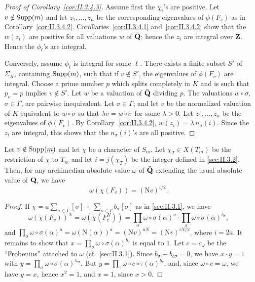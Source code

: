 \begin{proof}[Proof of Corollary~\ref{cor:II.3.4.3}]
Assume first the $\chi_i$'s are positive.  Let $v \notin \mathrm{Supp}(m)$ and
let $z_1, \ldots, z_n$ be the corresponding eigenvalues of $\phi(F_v)$
as in Corollary~\ref{cor:II.3.4.2}.  Corollaries~\ref{cor:II.3.4.1} and~\ref{cor:II.3.4.2} show that the $w(z_i)$ are
positive for all valuations $w$ of $\bar{\mathbf{Q}}$; hence the $z_i$ are
integral over $\mathbf{Z}$.  Hence the $\phi_\ell$'s are integral.

Conversely, assume $\phi_\ell$ is integral for some $\ell$.  There exists
a finite subset $S'$ of $\Sigma_K$, containing $\mathrm{Supp}(m)$, such that if
$v \notin S'$, the eigenvalues of $\phi(F_v)$ are integral.  Choose a
prime number $p$ which splits completely in $K$ and is such that
$p_v = p$ implies $v \notin S'$.  Let $w$ be a valuation of $\bar{\mathbf{Q}}$
dividing $p$.  The valuations $w \circ \sigma$, $\sigma \in \Gamma$, are
pairwise inequivalent.  Let $\sigma \in \Gamma$; and let $v$ be the
normalized valuation of $K$ equivalent to $w \circ \sigma$ so that
$\lambda v = w \circ \sigma$ for some $\lambda > 0$.  Let
$z_1, \ldots, z_n$ be the eigenvalues of $\phi(F_v)$.  By Corollary~\ref{cor:II.3.4.2},
$w(z_i) = \lambda\, n_\sigma(i)$.  Since the $z_i$ are integral, this
shows that the $n_\sigma(i)$'s are all positive.
\end{proof}

\begin{proposition}[2]\label{prop:II.3.4.2}
Let $v \notin \mathrm{Supp}(m)$ and let $\chi$ be a character of $S_m$.  Let
$\chi_T \in X(T_m)$ be the restriction of $\chi$ to $T_m$ and let
$i = j(\chi_T)$ be the integer defined in \ref{sec:II.3.2}.  Then, for any
archimedian absolute value $\omega$ of $\bar{\mathbf{Q}}$ extending the usual
absolute value of $\mathbf{Q}$, we have
\[
\omega(\chi(F_v)) = (\mathrm{N}v)^{i/2}.
\]
\end{proposition}

\begin{proof}
If $\chi = a \sum\limits_{\sigma \in \Gamma} [\sigma] +
\sum\limits_{\sigma \in \Gamma} b_\sigma[\sigma]$ as in \ref{sec:II.3.1}, we have
\[
\omega(\chi(F_v))^N = \omega(\chi(F_v^N)) = \prod_\sigma
\omega \circ \sigma(\alpha)^a \cdot \prod_\sigma
\omega \circ \sigma(\alpha)^{b_\sigma},
\]
and
$\prod\limits_\sigma \omega \circ \sigma(\alpha)^a
= \omega(\mathrm{N}(\alpha))^a = (\mathrm{N}v)^{aN}
= (\mathrm{N}v)^{iN/2}$, where $i = 2a$.  It remains to show that
$x = \prod\limits_\sigma \omega \circ \sigma(\alpha)^{b_\sigma}$ is equal
to $1$.  Let $c = c_\omega$ be the ``Frobenius'' attached to $\omega$
(cf.~\ref{sec:II.3.1}).  Since $b_\sigma + b_{c\sigma} = 0$, we have $x \cdot y = 1$
with $y = \prod\limits_\sigma \omega \circ \sigma(\alpha)^{b_{c\sigma}}$.
But $y = \prod\limits_\tau \omega \circ c \circ \tau(\alpha)^{b_\tau}$,
and, since $\omega \circ c = \omega$, we have $y = x$, hence $x^2 = 1$,
and $x = 1$, since $x > 0$.
\end{proof}

